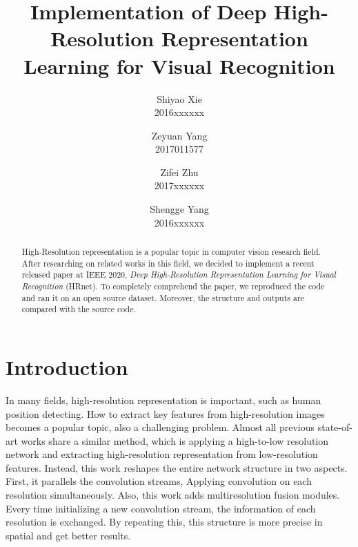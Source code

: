 \documentclass[10pt,twocolumn,letterpaper]{article}
\begin{document}
\title{Implementation of Deep High-Resolution Representation\\ Learning for Visual Recognition}

\author{Shiyao Xie\\
2016xxxxxx\\
\and
Zeyuan Yang\\
2017011577\\
\and
Zifei Zhu\\
2017xxxxxx\\
\and
Shengge Yang\\
2016xxxxxx\\
}

\maketitle

\begin{abstract}
   High-Resolution representation is a popular topic in computer vision research field.
   After researching on related works in this field,
   we decided to implement a recent released paper at IEEE 2020,
   \emph{Deep High-Resolution Representation Learning for Visual Recognition} (HRnet).\cite{wang2019deep}
   To completely comprehend the paper,
   we reproduced the code and ran it on an open source dataset.
   Moreover, the structure and outputs are compared with the source code.
\end{abstract}

\section{Introduction}

In many fields, high-resolution representation is important,
such as human position detecting.
How to extract key features from high-resolution images becomes a popular topic,
also a challenging problem.
Almost all previous state-of-art works share a similar method,
which is applying a high-to-low resolution network and extracting high-resolution representation from low-resolution features.
Instead, this work reshapes the entire network structure in two aspects.
First, it parallels the convolution streams,
Applying convolution on each resolution simultaneously.
Also, this work adds multiresolution fusion modules.
Every time initializing a new convolution stream,
the information of each resolution is exchanged.
By repeating this, this structure is more precise in spatial and get better results.
\end{document}
